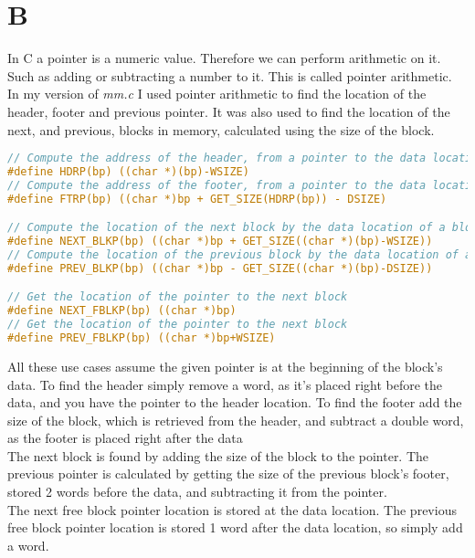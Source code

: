 \documentclass[11pt]{report}
\begin{document}
\section{B}
In C a pointer is a numeric value. Therefore we can perform arithmetic on it. Such as adding or subtracting a number to it. This is called pointer arithmetic.\\[1ex]

In my version of \textit{mm.c} I used pointer arithmetic to find the location of the header, footer and previous pointer. It was also used to find the location of the next, and previous, blocks in memory, calculated using the size of the block. 
\begin{lstlisting}[language=C]
// Compute the address of the header, from a pointer to the data location
#define HDRP(bp) ((char *)(bp)-WSIZE)
// Compute the address of the footer, from a pointer to the data location
#define FTRP(bp) ((char *)bp + GET_SIZE(HDRP(bp)) - DSIZE)

// Compute the location of the next block by the data location of a block
#define NEXT_BLKP(bp) ((char *)bp + GET_SIZE((char *)(bp)-WSIZE))
// Compute the location of the previous block by the data location of a block
#define PREV_BLKP(bp) ((char *)bp - GET_SIZE((char *)(bp)-DSIZE))

// Get the location of the pointer to the next block
#define NEXT_FBLKP(bp) ((char *)bp)
// Get the location of the pointer to the next block
#define PREV_FBLKP(bp) ((char *)bp+WSIZE)
\end{lstlisting}
All these use cases assume the given pointer is at the beginning of the block's data. To find the header simply remove a word, as it's placed right before the data, and you have the pointer to the header location. To find the footer add the size of the block, which is retrieved from the header, and subtract a double word, as the footer is placed right after the data\\[1ex]

The next block is found by adding the size of the block to the pointer. The previous pointer is calculated by getting the size of the previous block's footer, stored 2 words before the data, and subtracting it from the pointer.\\[1ex]

The next free block pointer location is stored at the data location. The previous free block pointer location is stored 1 word after the data location, so simply add a word.
\end{document}
